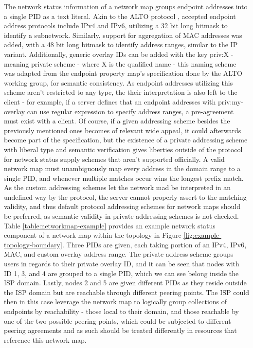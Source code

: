    The network status information of a network map groups endpoint addresses into a single PID as a text literal.
    Akin to the ALTO protocol \cite{alto-protocol}, accepted endpoint address protocols include IPv4 and IPv6, utilizing a 32 bit long bitmask to identify a subnetwork.
    Similarly, support for aggregation of MAC addresses was added, with a 48 bit long bitmask to identify address ranges, similar to the IP variant.
    Additionally, generic overlay IDs can be added with the key priv:X - meaning private scheme - where X is the qualified name - this naming scheme was adapted from the endpoint property map's specification done by the ALTO working group, for semantic consistency.
    As endpoint addresses utilizing this scheme aren't restricted to any type, the their interpretation is also left to the client - for example, if a server defines that an endpoint addresses with priv:my-overlay can use regular expression to specify address ranges, a pre-agreement must exist with a client.
    Of course, if a given addressing scheme besides the previously mentioned ones becomes of relevant wide appeal, it could afterwards become part of the specification, but the existence of a private addressing scheme with liberal type and semantic verification gives liberties outside of the protocol for network status supply schemes that aren't supported officially.
    A valid network map must unambiguously map every address in the domain range to a single PID, and whenever multiple matches occur wins the longest prefix match.
    As the custom addressing schemes let the network mad be interpreted in an undefined way by the protocol, the server cannot properly assert to the matching validity, and thus default protocol addressing schemes for network maps should be preferred, as semantic validity in private addressing schemes is not checked.
    Table \ref{table:networkmap-example} provides an example network status component of a network map within the topology in Figure \ref{fig:example-topology-boundary}.
    Three PIDs are given, each taking portion of an IPv4, IPv6, MAC, and custom overlay address range.
    The private address scheme groups users in regards to their private overlay ID, and it can be seen that nodes with ID 1, 3, and 4 are grouped to a single PID, which we can see belong inside the ISP domain.
    Lastly, nodes 2 and 5 are given different PIDs as they reside outside the ISP domain but are reachable through different peering points.
    The ISP could then in this case leverage the network map to logically group collections of endpoints by reachability - those local to their domain, and those reachable by one of the two possible peering points, which could be subjected to different peering agreements and as such should be treated differently in resources that reference this network map.

